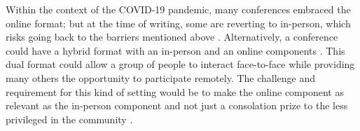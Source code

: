 \documentclass[10pt,letterpaper]{article}
\begin{document}
Within the context of the COVID-19 pandemic, many conferences embraced the online format; but at the time of writing, some are reverting to in-person, which risks going back to the barriers mentioned above \cite{jooKeepOnlineOption2021}.
Alternatively, a conference could have a hybrid format with an in-person and an online components . This dual format could allow a group of people to interact face-to-face while providing many others the opportunity to participate remotely. 
The challenge and requirement for this kind of setting would be to make the online component as relevant as the in-person component and not just a consolation prize to the less privileged in the community \cite{ninerBetterWhomLeveling2021}.


\end{document}
